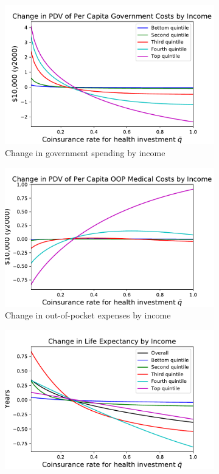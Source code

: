 \documentclass[12pt,pdftex,letterpaper]{article}
\begin{document}
\begin{figure}[h!]
\begin{subfigure}[b]{0.49\textwidth}
        \includegraphics[width=\textwidth]{../Figures/FlatCopayInvstGovtChangeByInc.pdf}
        \caption{Change in government spending by income}
    \end{subfigure}
    \begin{subfigure}[b]{0.49\textwidth}
        \centering
        \includegraphics[width=\textwidth]{../Figures/FlatCopayInvstOOPchangeByInc.pdf}
        \caption{Change in out-of-pocket expenses by income}
    \end{subfigure}
    \begin{subfigure}[b]{0.49\textwidth}
        \centering
        \includegraphics[width=\textwidth]{../Figures/FlatCopayInvstLifeExp.pdf}

\end{subfigure}
\end{figure}
\end{document}
